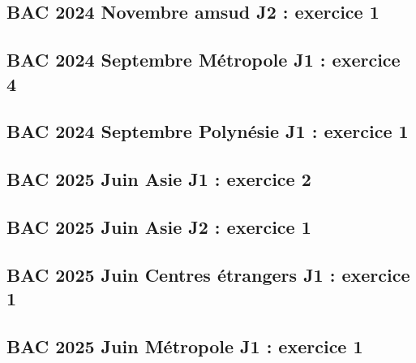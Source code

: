 \documentclass[lang=fr,edition=teacher,layout=sheet]{mxbook}
\begin{document}
\begingroup\endgroup
\par\bigskip
{}\subsection*{BAC 2024 Novembre amsud J2 : exercice 1}
\begingroup\endgroup
\par\bigskip
{}\subsection*{BAC 2024 Septembre Métropole J1 : exercice 4}
\begingroup\endgroup
\par\bigskip
{}\subsection*{BAC 2024 Septembre Polynésie J1 : exercice 1}
\begingroup\endgroup
\par\bigskip
{}\subsection*{BAC 2025 Juin Asie J1 : exercice 2}
\begingroup\endgroup
\par\bigskip
{}\subsection*{BAC 2025 Juin Asie J2 : exercice 1}
\begingroup\endgroup
\par\bigskip
{}\subsection*{BAC 2025 Juin Centres étrangers J1 : exercice 1}
\begingroup\endgroup
\par\bigskip
{}\subsection*{BAC 2025 Juin Métropole J1 : exercice 1}
\end{document}
